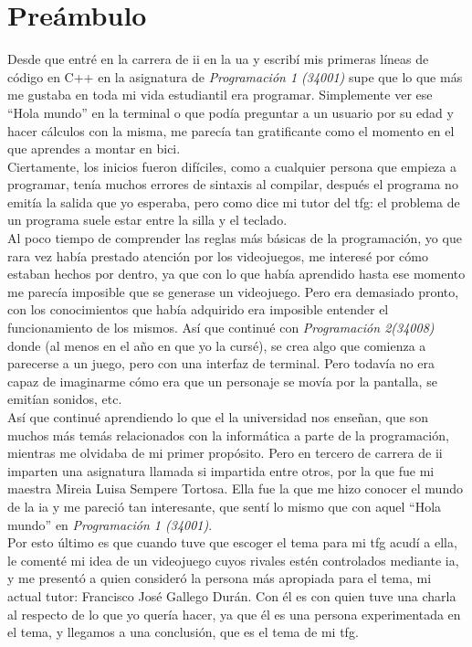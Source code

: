 
\chapter*{Preámbulo}
\thispagestyle{empty}
Desde que entré en la carrera de \gls{ii} en la \gls{ua} y escribí mis primeras líneas de código en C++ en la asignatura de \textit{Programación 1 (34001)} supe que lo que más me gustaba en toda mi vida estudiantil era programar. Simplemente ver ese ``Hola mundo'' en la terminal o que podía preguntar a un usuario por su edad y hacer cálculos con la misma, me parecía tan gratificante como el momento en el que aprendes a montar en bici.
\\
Ciertamente, los inicios fueron difíciles, como a cualquier persona que empieza a programar, tenía muchos errores de sintaxis al compilar, después el programa no emitía la salida que yo esperaba, pero como dice mi tutor del \gls{tfg}: el problema de un programa suele estar entre la silla y el teclado.
\\
Al poco tiempo de comprender las reglas más básicas de la programación, yo que rara vez había prestado atención por los videojuegos, me interesé por cómo estaban hechos por dentro, ya que con lo que había aprendido hasta ese momento me parecía imposible que se generase un videojuego. Pero era demasiado pronto, con los conocimientos que había adquirido era imposible entender el funcionamiento de los mismos. Así que continué con \textit{Programación 2(34008)} donde (al menos en el año en que yo la cursé), se crea algo que comienza a parecerse a un juego, pero con una interfaz de terminal. Pero todavía no era capaz de imaginarme cómo era que un personaje se movía por la pantalla, se emitían sonidos, etc.
\\
Así que continué aprendiendo lo que el la universidad nos enseñan, que son muchos más temás relacionados con la informática a parte de la programación, mientras me olvidaba de mi primer propósito. Pero en tercero de carrera de \gls{ii} imparten una asignatura llamada \gls{si} impartida entre otros, por la que fue mi maestra Mireia Luisa Sempere Tortosa. Ella fue la que me hizo conocer el mundo de la \gls{ia} y me pareció tan interesante, que sentí lo mismo que con aquel ``Hola mundo'' en \textit{Programación 1 (34001)}. 
\\
Por esto último es que cuando tuve que escoger el tema para mi \gls{tfg} acudí a ella, le comenté mi idea de un videojuego cuyos rivales estén controlados mediante \gls{ia}, y me presentó a quien consideró la persona más apropiada para el tema, mi actual tutor: Francisco José Gallego Durán. Con él es con quien tuve una charla al respecto de lo que yo quería hacer, ya que él es una persona experimentada en el tema, y llegamos a una conclusión, que es el tema de mi \gls{tfg}.


